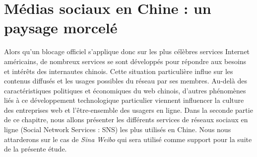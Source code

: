 \section[Médias sociaux en Chine : un paysage morcelé]{Médias sociaux en Chine : un paysage morcelé}
Alors qu’un blocage officiel s’applique donc sur les plus célèbres services Internet américains, de nombreux services se sont développés pour répondre aux besoins et intérêts des internautes chinois. Cette situation particulière influe sur les contenus diffusés et les usages possibles du réseau par ses membres. Au-delà des caractéristiques politiques et économiques du web chinois, d’autres phénomènes liés à ce développement technologique particulier viennent influencer la culture des entreprises web et l’être-ensemble des usagers en ligne. Dans la seconde partie de ce chapitre, nous allons présenter les différents services de réseaux sociaux en ligne (Social Network Services : SNS) les plus utilisés en Chine. Nous nous attarderons sur le cas de \textit{Sina Weibo} qui sera utilisé comme support pour la suite de la présente étude. 

